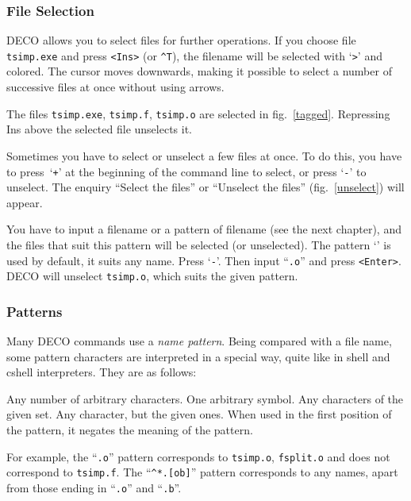 
\subsubsection{File Selection}

DECO allows you to select files for further operations. If
you choose file {\tt tsimp.exe} and press {\tt <Ins>} (or {\tt \^{}T}),
the filename will be selected with `{\tt >}' and colored. The cursor moves
downwards, making it possible to select a number of successive files at once
without using arrows.


The files {\tt tsimp.exe}, {\tt tsimp.f}, {\tt tsimp.o} are selected in
fig.~\ref{tagged}. Repressing Ins above the selected file unselects it.


Sometimes you have to select or unselect a few files at 
once. To do this, you have to press~`{\tt +}' at the beginning
of the command line to select, or press `{\tt -}' to unselect.
The enquiry ``Select the files'' or ``Unselect the files''
(fig.~\ref{unselect}) will appear.

You have to input a filename or a pattern of filename (see the next chapter),
and the files that suit this pattern will be selected (or unselected). The
pattern `{\tt *}' is used by default, it suits any name. Press `{\tt -}'.
Then input ``{\tt *.o}'' and press {\tt <Enter>}. DECO will unselect {\tt tsimp.o},
which suits the given pattern.

\subsubsection{Patterns}

Many DECO commands use a {\em name pattern}. Being compared with a file name,
some pattern characters are interpreted in a special way, quite like in
shell and cshell interpreters. They are as follows:
\begin{example}
\litem{{\tt *}}
Any number of arbitrary characters.
One arbitrary symbol.
\litem{{\tt [ab0-9]}}
Any characters of the given set.
\litem{{\tt [\^{}ab0-9]}}
Any character, but the given ones.
\litem{{\tt \^{}}}
When used in the first position of the pattern,
it negates the meaning of the pattern.
\end{example}

For example, the ``{\tt *.o}'' pattern corresponds to {\tt tsimp.o},
{\tt fsplit.o} and does not correspond to {\tt tsimp.f}. The
``{\tt \^{}*.[ob]}'' pattern corresponds to any names, apart from
those ending in ``{\tt .o}'' and ``{\tt .b}''.

